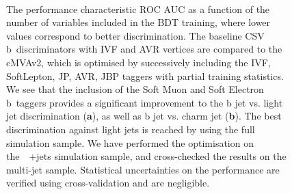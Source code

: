 \begin{figure}
\begin{centering}
 \\
\caption[The cMVAv2 performance as a function of training variables.]{The performance characteristic ROC AUC as a function of the number of variables included in the BDT training, where lower values correspond to better discrimination. The baseline CSV b~discriminators with IVF and AVR vertices are compared to the cMVAv2, which is optimised by successively including the IVF, SoftLepton, JP, AVR, JBP taggers with partial training statistics. We see that the inclusion of the Soft Muon and Soft Electron b~taggers provides a significant improvement to the b jet vs. light jet discrimination (\textbf{a}), as well as b jet vs. charm jet (\textbf{b}). The best discrimination against light jets is reached by using the full simulation sample. We have performed the optimisation on the~\ttbar~+jets simulation sample, and cross-checked the results on the multi-jet sample. Statistical uncertainties on the performance are verified using cross-validation and are negligible.}
\label{fig:btag_cmva_roc}
\end{centering}
\end{figure}

